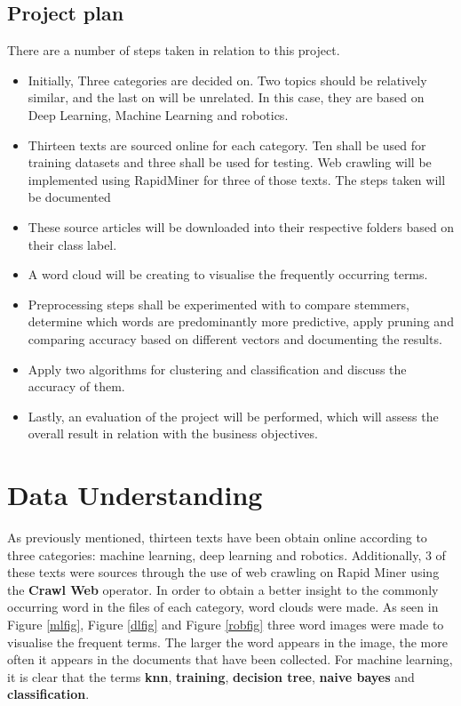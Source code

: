 \subsection*{Project plan}
There are a number of steps taken in relation to this project.
\begin{itemize}
	\item Initially, Three categories are decided on. Two topics should be relatively similar, and the last on will be unrelated. In this case, they are based on Deep Learning, Machine Learning and robotics.
	\item Thirteen texts are sourced online for each category. Ten shall be used for training datasets and three shall be used for testing. Web crawling will be implemented using RapidMiner for three of those texts. The steps taken will be documented 
	\item These source articles will be downloaded into their respective folders based on their class label.
	\item A word cloud will be creating to visualise the frequently occurring terms.
	\item Preprocessing steps shall be experimented with to compare stemmers, determine which words are predominantly more predictive, apply pruning and comparing accuracy based on different vectors and documenting the results.
	\item Apply two algorithms for clustering and classification and discuss the accuracy of them.
	\item Lastly, an evaluation of the project will be performed, which will assess the overall result in relation with the business objectives. 
\end{itemize}


\section*{Data Understanding}

As previously mentioned, thirteen texts have been obtain online according to three categories: machine learning, deep learning and robotics. Additionally, 3 of these texts were sources through the use of web crawling on Rapid Miner using the \textbf{Crawl Web} operator.
In order to obtain a better insight to the commonly occurring word in the files of each category, word clouds were made. As seen in Figure \ref{mlfig}, Figure \ref{dlfig} and Figure \ref{robfig} three word images were made to visualise the frequent terms. The larger the word appears in the image, the more often it appears in the documents that have been collected.
For machine learning, it is clear that the terms \textbf{knn}, \textbf{training}, \textbf{decision tree}, \textbf{naive bayes} and \textbf{classification}.

